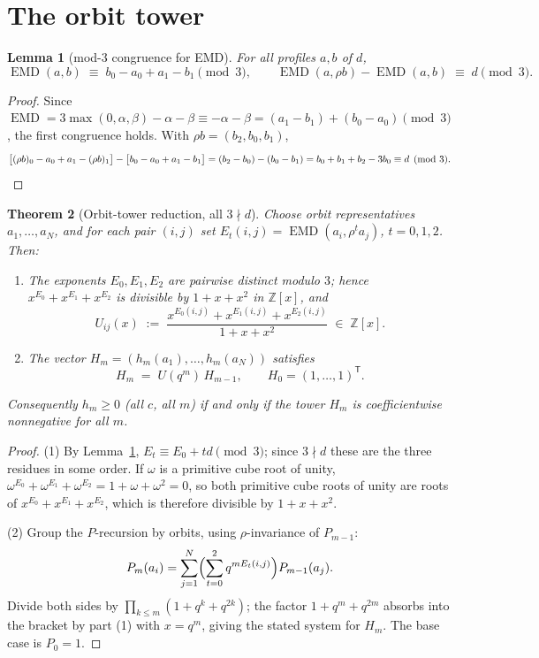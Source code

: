 \documentclass[11pt]{article}
\newtheorem{theorem}{Theorem}
\newtheorem{lemma}[theorem]{Lemma}
\theoremstyle{remark}
\newcommand{\emd}{\operatorname{EMD}}
\begin{document}
\section{The orbit tower}

\begin{lemma}[mod-3 congruence for EMD]\label{lem:mod3}
For all profiles $a,b$ of $d$,
\[
\emd(a,b)\;\equiv\; b_0-a_0+a_1-b_1 \pmod 3,
\qquad
\emd(a,\rho b)-\emd(a,b)\;\equiv\; d \pmod 3 .
\]
\end{lemma}

\begin{proof}
Since $\emd = 3\max(0,\alpha,\beta)-\alpha-\beta \equiv -\alpha-\beta
= (a_1-b_1)+(b_0-a_0) \pmod 3$, the first congruence holds. With
$\rho b=(b_2,b_0,b_1)$,
\[
\bigl[(\rho b)_0-a_0+a_1-(\rho b)_1\bigr]-\bigl[b_0-a_0+a_1-b_1\bigr]
= (b_2-b_0)-(b_0-b_1)= b_0+b_1+b_2-3b_0 \equiv d \pmod 3. \qedhere
\]
\end{proof}

\begin{theorem}[Orbit-tower reduction, all $3\nmid d$]\label{thm:tower}
Choose orbit representatives $a_1,\dots,a_N$, and for each pair $(i,j)$ set
$E_t(i,j)=\emd(a_i,\rho^t a_j)$, $t=0,1,2$. Then:
\begin{enumerate}
\item The exponents $E_0,E_1,E_2$ are pairwise distinct modulo $3$; hence
$x^{E_0}+x^{E_1}+x^{E_2}$ is divisible by $1+x+x^2$ in $\mathbb Z[x]$, and
\[
U_{ij}(x)\;:=\;\frac{x^{E_0(i,j)}+x^{E_1(i,j)}+x^{E_2(i,j)}}{1+x+x^2}
\;\in\;\mathbb Z[x].
\]
\item The vector $H_m=(h_m(a_1),\dots,h_m(a_N))$ satisfies
\[
H_m \;=\; U(q^m)\,H_{m-1},\qquad H_0=(1,\dots,1)^{\mathsf T}.
\]
\end{enumerate}
Consequently $h_m\ge 0$ (all $c$, all $m$) if and only if the tower
$H_m$ is coefficientwise nonnegative for all $m$.
\end{theorem}

\begin{proof}
(1) By Lemma~\ref{lem:mod3}, $E_t\equiv E_0+td \pmod 3$; since $3\nmid d$
these are the three residues in some order. If $\omega$ is a primitive cube
root of unity, $\omega^{E_0}+\omega^{E_1}+\omega^{E_2}=1+\omega+\omega^2=0$,
so both primitive cube roots of unity are roots of
$x^{E_0}+x^{E_1}+x^{E_2}$, which is therefore divisible by $1+x+x^2$.

(2) Group the $P$-recursion by orbits, using $\rho$-invariance of
$P_{m-1}$:
\[
P_m(a_i)=\sum_{j=1}^N\Bigl(\sum_{t=0}^2 q^{m E_t(i,j)}\Bigr)P_{m-1}(a_j).
\]
Divide both sides by $\prod_{k\le m}(1+q^k+q^{2k})$; the factor
$1+q^m+q^{2m}$ absorbs into the bracket by part (1) with $x=q^m$, giving
the stated system for $H_m$. The base case is $P_0=1$.
\end{proof}
\end{document}
